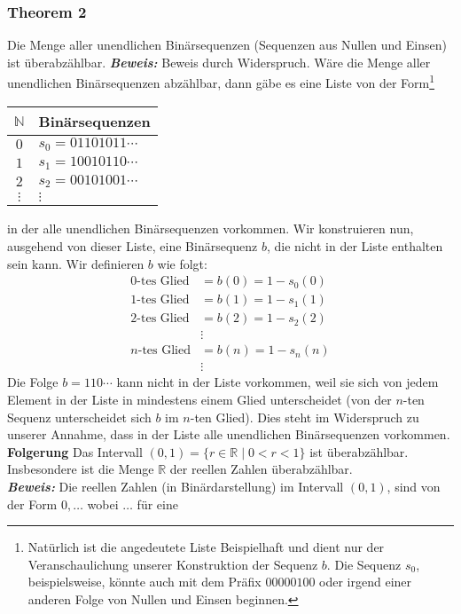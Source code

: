 \subsubsection{Theorem 2}%
\label{ssub:theorem_2}
Die Menge aller unendlichen Binärsequenzen (Sequenzen aus Nullen und Einsen) ist überabzählbar.
\textbf{\textit{Beweis: }}
Beweis durch Widerspruch. Wäre die Menge aller unendlichen Binärsequenzen abzählbar, dann gäbe es eine Liste von der Form\footnote{Natürlich ist die angedeutete Liste Beispielhaft und dient nur der Veranschaulichung unserer Konstruktion der Sequenz $b$. Die Sequenz $s_0$, beispielsweise, könnte auch mit dem Präfix $00000100$ oder irgend einer anderen Folge von Nullen und Einsen beginnen. }
\begin{center}
\begin{tabular}{c|l}
$\mathbb{N}$ & Binärsequenzen\\
\hline
$0$ & $s_0=01101011\cdots$\\
$1$ & $s_1=10010110\cdots$\\
$2$ & $s_2=00101001\cdots$\\
$\vdots$ & $\vdots$
\end{tabular}
\end{center}
in der alle unendlichen Binärsequenzen vorkommen. Wir konstruieren nun, ausgehend von dieser Liste, eine Binärsequenz $b$, die nicht in der Liste enthalten sein kann. Wir definieren $b$ wie folgt:
\begin{align*}
0\text{-tes Glied}&=b(0)=1-s_0(0)\\
1\text{-tes Glied}&=b(1)=1-s_1(1)\\
2\text{-tes Glied}&=b(2)=1-s_2(2)\\
&\vdots\\
n\text{-tes Glied}&=b(n)=1-s_n(n)\\
&\vdots
\end{align*}
Die Folge $b=110\cdots$ kann nicht in der Liste vorkommen, weil sie sich von jedem Element in der Liste in mindestens
einem Glied unterscheidet (von der $n$-ten Sequenz unterscheidet sich $b$ im $n$-ten Glied). Dies steht im Widerspruch
zu unserer Annahme, dass in der Liste alle unendlichen Binärsequenzen vorkommen.\\
\textbf{Folgerung }
Das Intervall $(0,1)=\{r\in\mathbb{R}\mid 0<r<1 \}$ ist überabzählbar. Insbesondere ist die Menge $\mathbb{R}$ der reellen Zahlen
überabzählbar.\\
\textbf{\textit{Beweis: }}
Die reellen Zahlen (in Binärdarstellung) im Intervall $(0,1)$, sind von der Form $0,\dots$ wobei $\dots$ für eine

